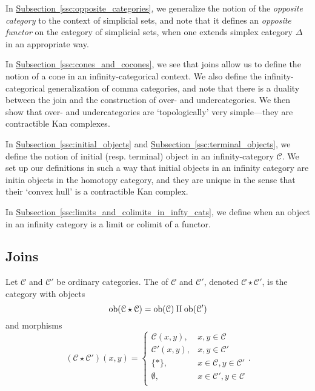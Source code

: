 \documentclass[main.tex]{subfiles}
\begin{document}
In \hyperref[ssc:opposite_categories]{Subsection~\ref*{ssc:opposite_categories}}, we generalize the notion of the \emph{opposite category} to the context of simplicial sets, and note that it defines an \emph{opposite functor} on the category of simplicial sets, when one extends simplex category $\Delta$ in an appropriate way.

In \hyperref[ssc:cones_and_cocones]{Subsection~\ref*{ssc:cones_and_cocones}}, we see that joins allow us to define the notion of a cone in an infinity-categorical context. We also define the infinity-categorical generalization of comma categories, and note that there is a duality between the join and the construction of over- and undercategories. We then show that over- and undercategories are `topologically' very simple---they are contractible Kan complexes.

In \hyperref[ssc:initial_objects]{Subsection~\ref*{ssc:initial_objects}} and \hyperref[ssc:terminal_objects]{Subsection~\ref*{ssc:terminal_objects}}, we define the notion of initial (resp. terminal) object in an infinity-category $\mathcal{C}$. We set up our definitions in such a way that initial objects in an infinity category are initia objects in the homotopy category, and they are unique in the sense that their `convex hull' is a contractible Kan complex.

In \hyperref[ssc:limits_and_colimits_in_infty_cats]{Subsection~\ref*{ssc:limits_and_colimits_in_infty_cats}}, we define when an object in an infinity category is a limit or colimit of a functor.

\subsection{Joins}
\label{ssc:joins}

\begin{definition}
  \label{def:join_of_categories}
  Let $\mathcal{C}$ and $\mathcal{C}'$ be ordinary categories. The  of $\mathcal{C}$ and $\mathcal{C}'$, denoted $\mathcal{C} \star \mathcal{C}'$, is the category with objects
  \begin{equation*}
    \operatorname{\mathrm{ob}}(\mathcal{C} \star \mathcal{C}) = \operatorname{\mathrm{ob}}(\mathcal{C}) \amalg \operatorname{\mathrm{ob}}(\mathcal{C}')
  \end{equation*}
  and morphisms
  \begin{equation*}
    (\mathcal{C} \star \mathcal{C}')(x, y) =
    \begin{cases}
      \mathcal{C}(x, y), & x, y \in \mathcal{C} \\
      \mathcal{C}'(x, y), & x, y \in \mathcal{C}' \\
      \{*\}, & x \in \mathcal{C}, y \in \mathcal{C}' \\
      \emptyset, & x \in \mathcal{C}', y \in \mathcal{C} \\
    \end{cases}.
  \end{equation*}
\end{definition}
\end{document}

